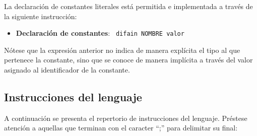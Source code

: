 \documentclass[10pt,a4paper]{article}
\begin{document}
La declaración de constantes literales está permitida e implementada a través de la siguiente instrucción:
\begin{itemize}
    \item \textbf{Declaración de constantes}: \texttt{\color{blue} difain NOMBRE valor}
\end{itemize}
Nótese que la expresión anterior no indica de manera explícita el tipo al que pertenece la constante, sino que se conoce de manera implícita a través del valor asignado al identificador de la constante.

\subsection{Instrucciones del lenguaje}\label{subsec:Instrucciones del lenguaje}
A continuación se presenta el repertorio de instrucciones del lenguaje. Préstese atención a aquellas que terminan con el caracter ``;'' para delimitar su final:
\end{document}
